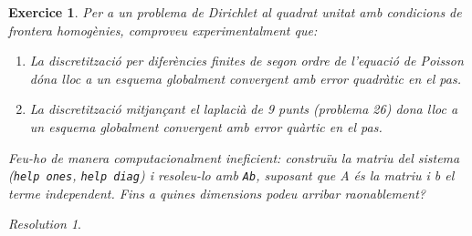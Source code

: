\documentclass[10pt,a4paper]{article}
\newtheorem{exercici}{Exercice}
\theoremstyle{definition}
\theoremstyle{remark}
\newtheorem*{res}{Resolution}
\begin{document}
\setcounter{exercici}{27}
\begin{exercici}
  Per a un problema de Dirichlet al quadrat unitat amb condicions de frontera homogènies, comproveu experimentalment que:
  \begin{enumerate}
    \item La discretització per diferències finites de segon ordre de l'equació
          de Poisson dóna lloc a un esquema globalment convergent amb error quadràtic en el pas.
    \item La discretització mitjançant el laplacià de 9 punts (problema 26) dona lloc a un esquema globalment convergent amb error quàrtic en el pas.
  \end{enumerate}
  Feu-ho de manera computacionalment ineficient: construïu la matriu del sistema (\texttt{help ones}, \texttt{help diag}) i resoleu-lo amb \texttt{Ab}, suposant que A és la matriu i b el terme independent. Fins a quines dimensions podeu arribar raonablement?
\end{exercici}
\begin{res}

\end{res}
\end{document}
